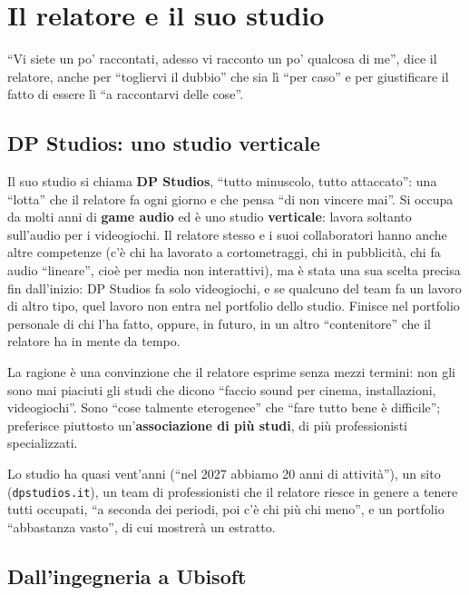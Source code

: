 \section{Il relatore e il suo studio}
\label{z9:sec:relatore}

``Vi siete un po' raccontati, adesso vi racconto un po' qualcosa di me'', dice il
relatore, anche per ``togliervi il dubbio'' che sia lì ``per caso'' e per
giustificare il fatto di essere lì ``a raccontarvi delle cose''.

\subsection{DP Studios: uno studio verticale}

Il suo studio si chiama \textbf{DP Studios}, ``tutto minuscolo, tutto
attaccato'': una ``lotta'' che il relatore fa ogni giorno e che pensa ``di non
vincere mai''. Si occupa da molti anni di \textbf{game audio} ed è uno studio
\textbf{verticale}: lavora soltanto sull'audio per i videogiochi. Il relatore
stesso e i suoi collaboratori hanno anche altre competenze (c'è chi ha lavorato a
cortometraggi, chi in pubblicità, chi fa audio ``lineare'', cioè per media non
interattivi), ma è stata una sua scelta precisa fin dall'inizio: DP Studios fa
solo videogiochi, e se qualcuno del team fa un lavoro di altro tipo, quel lavoro
non entra nel portfolio dello studio. Finisce nel portfolio personale di chi
l'ha fatto, oppure, in futuro, in un altro ``contenitore'' che il relatore ha in
mente da tempo.

La ragione è una convinzione che il relatore esprime senza mezzi termini: non gli
sono mai piaciuti gli studi che dicono ``faccio sound per cinema, installazioni,
videogiochi''. Sono ``cose talmente eterogenee'' che ``fare tutto bene è
difficile''; preferisce piuttosto un'\textbf{associazione di più studi}, di più
professionisti specializzati.

Lo studio ha quasi vent'anni (``nel 2027 abbiamo 20 anni di attività''), un sito
(\texttt{dpstudios.it}), un team di professionisti che il relatore riesce in
genere a tenere tutti occupati, ``a seconda dei periodi, poi c'è chi più chi
meno'', e un portfolio ``abbastanza vasto'', di cui mostrerà un estratto.

\subsection{Dall'ingegneria a Ubisoft}

